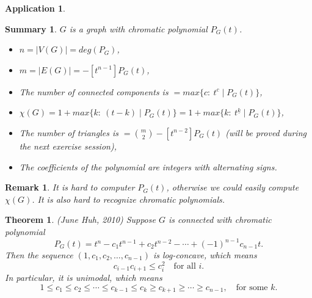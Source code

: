 \documentclass[a4paper]{article}
\theoremstyle{plain}
\newtheorem{theorem}[lemma]{Theorem}
\theoremstyle{myremark}
\newtheorem{remark}[lemma]{Remark}
\newtheorem{application}[lemma]{Application}
\newtheorem*{summary}{Summary}
\begin{document}
\begin{application}
\begin{enumerate}
\begin{figure}[H]
\begin{center}
\end{center}
\end{figure}
\end{enumerate}
\end{application}

\begin{summary} $G$ is a graph with chromatic polynomial $P_G(t)$.
\begin{itemize}
\item $n=|V(G)|=deg(P_G)$,
\item $m=|E(G)|=-[t^{n-1}]P_G(t)$,
\item The number of connected components is $=max \{c: \ t^c \mid P_G(t) \}$,
\item $\chi(G) = 1+ max \{k: \ (t-k) \mid P_G(t) \}=1+ max \{k: \ t^{\underline{k}} \mid P_G(t) \}$,
\item The number of triangles is $={m \choose 2}-[t^{n-2}]P_G(t)$ (will be proved during the next exercise session),
\item The coefficients of the polynomial are integers with alternating signs.
\end{itemize}
\end{summary}

\begin{remark} It is hard to computer $P_G(t)$, otherwise we could easily compute $\chi(G)$. It is also hard to recognize chromatic polynomials.
\end{remark}

\begin{theorem} \emph{(June Huh, 2010)}
Suppose $G$ is connected with chromatic polynomial
$$P_G(t)=t^n-c_1t^{n-1}+c_2t^{n-2}-\cdots +(-1)^{n-1}c_{n-1}t.$$
Then the sequence $(1,c_1,c_2,\dots,c_{n-1})$ is log-concave, which means
$$c_{i-1}c_{i+1}\leqslant c_i^2 \quad \text{for all } i.$$
In particular, it is unimodal, which means
$$1 \leqslant c_1 \leqslant c_2 \leqslant \cdots \leqslant c_{k-1} \leqslant c_k \geqslant c_{k+1} \geqslant \cdots \geqslant c_{n-1}, \quad \text{for some } k.$$
\end{theorem}
\end{document}
